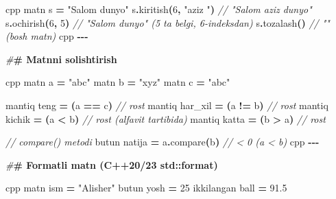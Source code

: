 \documentclass[a4paper,11pt,twoside,openright]{book}
\newenvironment{Shaded}{\begin{snugshade}}{\end{snugshade}}
\newcommand{\CommentTok}[1]{\textcolor[rgb]{0.56,0.35,0.01}{\textit{#1}}}
\newcommand{\DecValTok}[1]{\textcolor[rgb]{0.00,0.00,0.81}{#1}}
\newcommand{\ErrorTok}[1]{\textcolor[rgb]{0.64,0.00,0.00}{\textbf{#1}}}
\newcommand{\FloatTok}[1]{\textcolor[rgb]{0.00,0.00,0.81}{#1}}
\newcommand{\NormalTok}[1]{#1}
\newcommand{\OperatorTok}[1]{\textcolor[rgb]{0.81,0.36,0.00}{\textbf{#1}}}
\newcommand{\PreprocessorTok}[1]{\textcolor[rgb]{0.56,0.35,0.01}{\textit{#1}}}
\newcommand{\StringTok}[1]{\textcolor[rgb]{0.31,0.60,0.02}{#1}}
\begin{document}
\begin{Shaded}
\begin{Highlighting}[]
\ErrorTok{\textasciigrave{}\textasciigrave{}\textasciigrave{}}\NormalTok{cpp}
\NormalTok{matn s }\OperatorTok{=} \StringTok{"Salom dunyo"}
\NormalTok{s}\OperatorTok{.}\NormalTok{kiritish}\OperatorTok{(}\DecValTok{6}\OperatorTok{,} \StringTok{"aziz "}\OperatorTok{)}          \CommentTok{// "Salom aziz dunyo"}
\NormalTok{s}\OperatorTok{.}\NormalTok{ochirish}\OperatorTok{(}\DecValTok{6}\OperatorTok{,} \DecValTok{5}\OperatorTok{)}                 \CommentTok{// "Salom dunyo" (5 ta belgi, 6{-}indeksdan)}
\NormalTok{s}\OperatorTok{.}\NormalTok{tozalash}\OperatorTok{()}                     \CommentTok{// "" (bo\textquotesingle{}sh matn)}
\ErrorTok{\textasciigrave{}\textasciigrave{}\textasciigrave{}}\NormalTok{cpp}
\OperatorTok{{-}{-}{-}}

\PreprocessorTok{\#}\ErrorTok{\# Matnni solishtirish}

\ErrorTok{\textasciigrave{}\textasciigrave{}\textasciigrave{}}\NormalTok{cpp}
\NormalTok{matn a }\OperatorTok{=} \StringTok{"abc"}
\NormalTok{matn b }\OperatorTok{=} \StringTok{"xyz"}
\NormalTok{matn c }\OperatorTok{=} \StringTok{"abc"}

\NormalTok{mantiq teng }\OperatorTok{=} \OperatorTok{(}\NormalTok{a }\OperatorTok{==}\NormalTok{ c}\OperatorTok{)}           \CommentTok{// rost}
\NormalTok{mantiq har\_xil }\OperatorTok{=} \OperatorTok{(}\NormalTok{a }\OperatorTok{!=}\NormalTok{ b}\OperatorTok{)}        \CommentTok{// rost}
\NormalTok{mantiq kichik }\OperatorTok{=} \OperatorTok{(}\NormalTok{a }\OperatorTok{\textless{}}\NormalTok{ b}\OperatorTok{)}          \CommentTok{// rost (alfavit tartibida)}
\NormalTok{mantiq katta }\OperatorTok{=} \OperatorTok{(}\NormalTok{b }\OperatorTok{\textgreater{}}\NormalTok{ a}\OperatorTok{)}           \CommentTok{// rost}

\CommentTok{// compare() metodi}
\NormalTok{butun natija }\OperatorTok{=}\NormalTok{ a}\OperatorTok{.}\NormalTok{compare}\OperatorTok{(}\NormalTok{b}\OperatorTok{)}      \CommentTok{// \textless{} 0 (a \textless{} b)}
\ErrorTok{\textasciigrave{}\textasciigrave{}\textasciigrave{}}\NormalTok{cpp}
\OperatorTok{{-}{-}{-}}

\PreprocessorTok{\#}\ErrorTok{\# Formatli matn (C++20/23 \textasciigrave{}std::format\textasciigrave{})}

\ErrorTok{\textasciigrave{}\textasciigrave{}\textasciigrave{}}\NormalTok{cpp}
\NormalTok{matn ism }\OperatorTok{=} \StringTok{"Alisher"}
\NormalTok{butun yosh }\OperatorTok{=} \DecValTok{25}
\NormalTok{ikkilangan ball }\OperatorTok{=} \FloatTok{91.5}


\end{Highlighting}
\end{Shaded}
\end{document}
